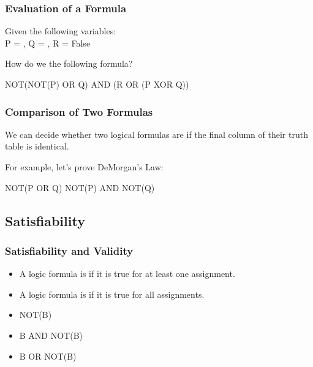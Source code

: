 \documentclass{beamer}
\begin{document}
\begin{frame}
  \frametitle{Evaluation of a Formula}

  Given the following variables:\\ P = , Q = , R = \alert{False}

  \vfill

  How do we  the following formula?
  \begin{center}
    NOT(NOT(P) OR Q) AND (R OR (P XOR Q))
  \end{center}
\end{frame}

\begin{frame}
  \frametitle{Comparison of Two Formulas}

  We can decide whether two logical formulas are
   if the final column of their truth table is
  identical.

  \vfill

  For example, let's prove DeMorgan's Law:
  \begin{center}
    NOT(P OR Q)  NOT(P) AND NOT(Q)
  \end{center}
\end{frame}

\subsection{Satisfiability}

\begin{frame}
  \frametitle{Satisfiability and Validity}

  \begin{itemize}
  \item A logic formula is  if it is true for
    \alert{at least one} assignment.
  \item A logic formula is  if it is true for
    \alert{all} assignments.
  \end{itemize}

  \vfill

  \begin{itemize}
  \item {} NOT(B)
  \item {} B AND NOT(B)
  \item {} B OR NOT(B)
  \end{itemize}
\end{frame}
\end{document}
